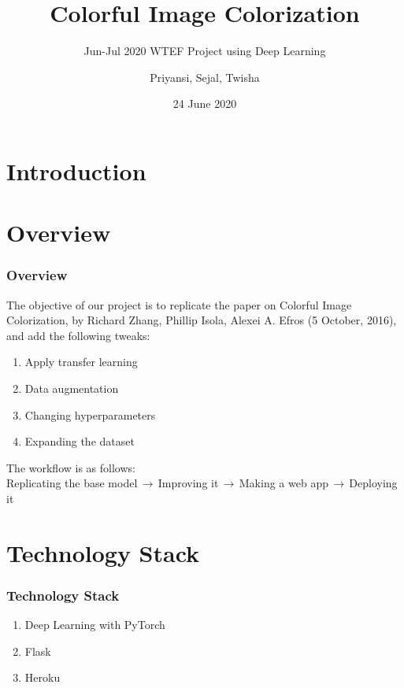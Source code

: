 \documentclass[16pt, subsection=false]{beamer}
\title{Colorful Image Colorization}
\subtitle{Jun-Jul 2020 WTEF Project using Deep Learning}
\author[Team 9]{Priyansi, Sejal, Twisha}
\date{24 June 2020}
\begin{document}
\section{Introduction}
\begin{frame}
	\titlepage
\end{frame}

\section{Overview}
\begin{frame}
	\frametitle{Overview}
	The objective of our project is to replicate the paper on Colorful Image Colorization, by Richard Zhang,
	Phillip Isola, Alexei A. Efros (5 October, 2016), and add the following tweaks:
	\begin{enumerate}
		\item Apply transfer learning
		\item Data augmentation
		\item Changing hyperparameters
		\item Expanding the dataset
	\end{enumerate}
	The workflow is as follows: \\
	Replicating the base model$\,\to\,$Improving it$\,\to\,$Making a web app$\,\to\,$Deploying it
\end{frame}

\section{Technology Stack}
\begin{frame}
	\frametitle{Technology Stack}
	\begin{enumerate}
		\item Deep Learning with PyTorch \\
		\item Flask
		\item Heroku
	\end{enumerate}
\end{frame}
\end{document}
